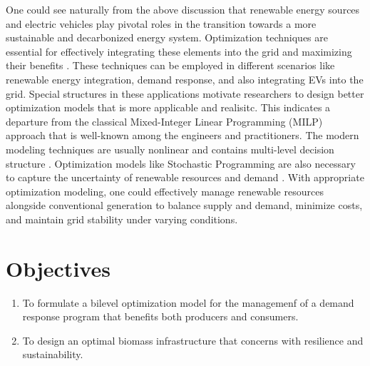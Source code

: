\documentclass[12pt]{report}
\begin{document}
One could see naturally from the above discussion that renewable energy sources and electric vehicles play pivotal roles in the transition towards a more sustainable and decarbonized energy system. 
Optimization techniques are essential for effectively integrating these elements into the grid and maximizing their benefits \cite{NEBEY20245422}. 
These techniques can be employed in different scenarios like renewable energy integration, demand response, and also integrating EVs into the grid.
Special structures in these applications motivate researchers to design better optimization models that is more applicable and realisitc.
This indicates a departure from the classical Mixed-Integer Linear Programming (MILP) approach that is well-known among the engineers and practitioners.
The modern modeling techniques are usually nonlinear and contains multi-level decision structure \cite{zbMATH07661004}.
Optimization models like Stochastic Programming are also necessary to capture the uncertainty of renewable resources and demand \cite{SEYEDNOURI2024100531}. 
With appropriate optimization modeling, one could effectively manage renewable resources alongside conventional generation to balance supply and demand, minimize costs, and maintain grid stability under varying conditions. 


\section{Objectives}
\begin{enumerate}[label=\arabic*.]
  \item To formulate a bilevel optimization model for the managemenf of a demand response program that benefits both producers and consumers.
  \item To design an optimal biomass infrastructure that concerns with resilience and sustainability.
\end{enumerate}
\end{document}
